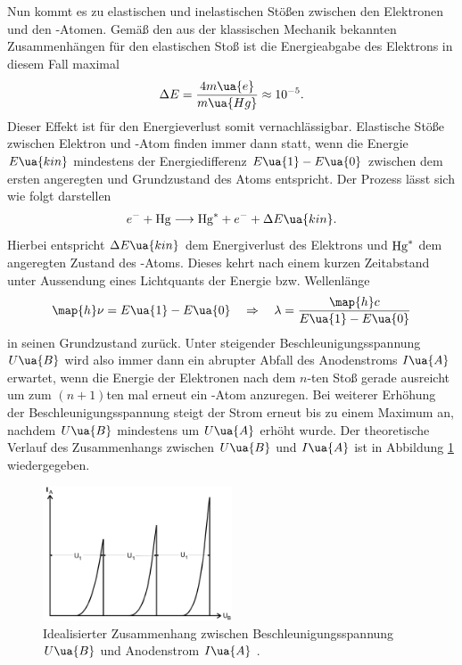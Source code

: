 Nun kommt es zu elastischen und inelastischen Stößen zwischen den Elektronen und den -Atomen. Gemäß %
den aus der klassischen Mechanik bekannten Zusammenhängen für den elastischen Stoß ist die Energieabgabe
des Elektrons in diesem Fall maximal
\begin{equation}
  \Delta E = \frac{4 m\ua{e}}{m\ua{Hg}} \approx \num{e-5}.
\end{equation}
Dieser Effekt ist für den Energieverlust somit vernachlässigbar. Elastische Stöße zwischen Elektron und
-Atom finden immer dann statt, wenn die Energie $E\ua{kin}$ mindestens der Energiedifferenz $E\ua{1} - E\ua{0}$
zwischen dem ersten angeregten und Grundzustand des  Atoms entspricht. Der Prozess lässt sich wie folgt darstellen
\begin{equation}
  e^{-} + \ce{Hg} \longrightarrow \ce{Hg}^{*} + e^{-} + \Delta E\ua{kin}.
\end{equation}
Hierbei entspricht $\Delta E\ua{kin}$ dem Energiverlust des Elektrons und $\ce{Hg}^*$ dem angeregten Zustand des
-Atoms. Dieses kehrt nach einem kurzen Zeitabstand unter Aussendung eines Lichtquants der Energie bzw. Wellenlänge
\begin{equation}
  \map{h}\nu = E\ua{1} - E\ua{0} \quad \Rightarrow \quad \lambda = \frac{\map{h} c}{E\ua{1} - E\ua{0}}
  \label{eq: wellenlänge}
\end{equation}
in seinen Grundzustand zurück. Unter steigender Beschleunigungsspannung $U\ua{B}$ wird also immer dann ein
abrupter Abfall des Anodenstroms $I\ua{A}$ erwartet, wenn die Energie der Elektronen nach dem $n$-ten Stoß gerade
ausreicht um zum $(n+1)$ten mal erneut ein -Atom anzuregen. Bei weiterer Erhöhung der Beschleunigungsspannung
steigt der Strom erneut bis zu einem Maximum an, nachdem $U\ua{B}$ mindestens um $U\ua{A}$ erhöht wurde.
Der theoretische Verlauf des Zusammenhangs zwischen
$U\ua{B}$ und $I\ua{A}$ ist in Abbildung \ref{fig: theo_verlauf} wiedergegeben.
\begin{figure}
  \centering
  \includegraphics[width = 0.5\textwidth]{pics/theo_verlauf.png}
  \caption{Idealisierter Zusammenhang zwischen Beschleunigungsspannung $U\ua{B}$ und Anodenstrom $I\ua{A}$ \cite{anleitung601}.}
  \label{fig: theo_verlauf}
\end{figure}
